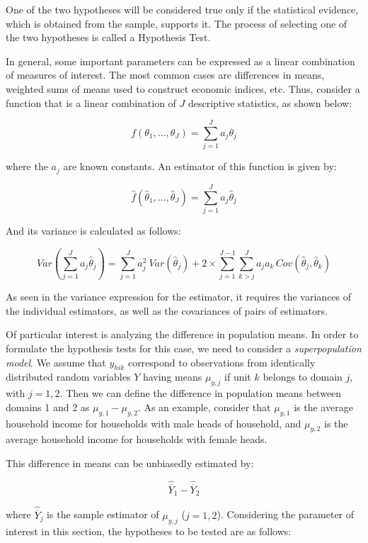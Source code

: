 \documentclass[
  12pt,
]{book}
\begin{document}
One of the two hypotheses will be considered true only if the statistical evidence, which is obtained from the sample, supports it. The process of selecting one of the two hypotheses is called a Hypothesis Test.

In general, some important parameters can be expressed as a linear combination of measures of interest. The most common cases are differences in means, weighted sums of means used to construct economic indices, etc. Thus, consider a function that is a linear combination of \(J\) descriptive statistics, as shown below:

\[
f \left( \theta_{1}, \ldots,\theta_{J}\right) = \sum_{j=1}^{J}a_{j}\theta_{j}
\]

where the \(a_{j}\) are known constants. An estimator of this function is given by:

\[
\widehat{f} \left( \widehat{\theta}_{1}, \ldots, \widehat{\theta}_{J} \right) = \sum_{j=1}^{J} a_{j} \widehat{\theta}_{j}
\]

And its variance is calculated as follows:

\[
Var \left( \sum_{j=1}^{J} a_{j} \widehat{\theta}_{j} \right) = \sum_{j=1}^{J} a_{j}^{2} \ Var\left( \widehat{\theta}_{j} \right) + 2 \times \sum_{j=1}^{J-1} \sum_{k>j}^{J} a_{j} a_{k} \, Cov \left( \widehat{\theta}_{j} , \widehat{\theta}_{k} \right)
\]

As seen in the variance expression for the estimator, it requires the variances of the individual estimators, as well as the covariances of pairs of estimators.

Of particular interest is analyzing the difference in population means. In order to formulate the hypothesis tests for this case, we need to consider a \emph{superpopulation model}. We assume that \(y_{hik}\) correspond to observations from identically distributed random variables \(Y\) having means \(\mu_{y,j}\) if unit \(k\) belongs to domain \(j\), with \(j = 1, 2\). Then we can define the difference in population means between domains 1 and 2 as \(\mu_{y,1} - \mu_{y,2}\). As an example, consider that \(\mu_{y,1}\) is the average household income for households with male heads of household, and \(\mu_{y,2}\) is the average household income for households with female heads.

This difference in means can be unbiasedly estimated by:

\[
\widehat{\overline{Y}}_{1} - \widehat{\overline{Y}}_{2}
\]

where \(\widehat{\overline{Y}}_{j}\) is the sample estimator of \(\mu_{y,j}\) (\(j = 1, 2\)). Considering the parameter of interest in this section, the hypotheses to be tested are as follows:
\end{document}
